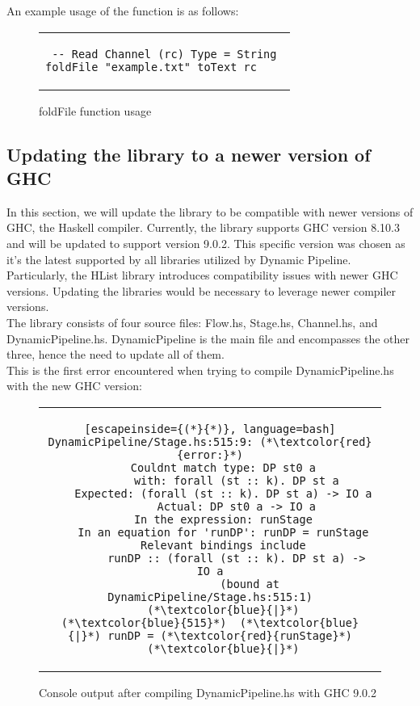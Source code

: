 An example usage of the function is as follows:

\begin{figure}[H]
    \begin{tabular}{c}
        \begin{lstlisting}
-- Read Channel (rc) Type = String
foldFile "example.txt" toText rc	
        \end{lstlisting}
    \end{tabular}
    \caption[{[Code]} foldFile example]{foldFile function usage}
    \label{fig:HC24b}
\end{figure}

\subsection{Updating the library to a newer version of GHC}
In this section, we will update the library to be compatible with newer versions of GHC, the Haskell compiler.
Currently, the library supports GHC version 8.10.3 and will be updated to support version 9.0.2.
This specific version was chosen as it's the latest supported by all libraries utilized by Dynamic Pipeline.
Particularly, the HList library introduces compatibility issues with newer GHC versions.
Updating the libraries would be necessary to leverage newer compiler versions.\\

The library consists of four source files: Flow.hs, Stage.hs, Channel.hs, and DynamicPipeline.hs.
DynamicPipeline is the main file and encompasses the other three, hence the need to update all of them.\\

This is the first error encountered when trying to compile DynamicPipeline.hs with the new GHC version:

\begin{figure}[H]
    \begin{tabular}{c}
        \begin{lstlisting}[escapeinside={(*}{*)}, language=bash]
DynamicPipeline/Stage.hs:515:9: (*\textcolor{red}{error:}*)
    Couldnt match type: DP st0 a
        with: forall (st :: k). DP st a
    Expected: (forall (st :: k). DP st a) -> IO a
        Actual: DP st0 a -> IO a
    In the expression: runStage
    In an equation for 'runDP': runDP = runStage
    Relevant bindings include
        runDP :: (forall (st :: k). DP st a) -> IO a
            (bound at DynamicPipeline/Stage.hs:515:1)
    (*\textcolor{blue}{|}*)
(*\textcolor{blue}{515}*)  (*\textcolor{blue}{|}*) runDP = (*\textcolor{red}{runStage}*)
    (*\textcolor{blue}{|}*)
        \end{lstlisting}
    \end{tabular}
    \caption[{[Lib] First console output} unfoldFilebyChars definition]{Console output after compiling DynamicPipeline.hs with GHC 9.0.2}
    \label{fig:HC25}
\end{figure}

